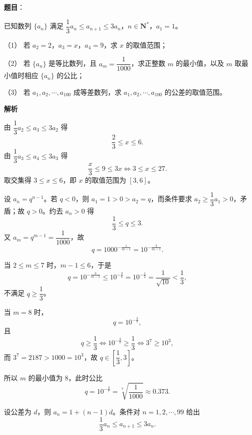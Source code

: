\begin{answer}

\textbf{题目}：

已知数列 $\{a_n\}$ 满足 $\dfrac13a_n\leqslant a_{n+1}\leqslant3a_n$，$n\in\mathbf N^*$，$a_1=1$。

（1） 若 $a_2=2$，$a_3=x$，$a_4=9$，求 $x$ 的取值范围；

（2） 若 $\{a_n\}$ 是等比数列，且 $a_m=\dfrac1{1000}$，求正整数 $m$ 的最小值，以及 $m$ 取最小值时相应 $\{a_n\}$ 的公比；

（3） 若 $a_1,a_2,\cdots,a_{100}$ 成等差数列，求 $a_1,a_2,\cdots,a_{100}$ 的公差的取值范围。

\textbf{解析}


由 $\dfrac13a_2\leqslant a_3\leqslant3a_2$ 得
\nopagebreak[4]
\[\frac23\leqslant x\leqslant6 .\]
由 $\dfrac13a_3\leqslant a_4\leqslant3a_3$ 得
\nopagebreak[4]
\[\frac x3\leqslant9\leqslant3x\iff3\leqslant x\leqslant27 .\]
取交集得 $3\leqslant x\leqslant6$，即 $x$ 的取值范围为 $[3,6]$。


设 $a_n=q^{n-1}$。若 $q<0$，则 $a_1=1>0>a_2=q$，而条件要求 $a_2\geqslant\dfrac13a_1>0$，矛盾；故 $q>0$。约去 $a_n>0$ 得
\nopagebreak[4]
\[\frac13\leqslant q\leqslant3 .\]
又 $a_m=q^{m-1}=\dfrac1{1000}$，故
\nopagebreak[4]
\[q=1000^{-\frac1{m-1}}=10^{-\frac3{m-1}} .\]

当 $2\leqslant m\leqslant7$ 时，$m-1\leqslant6$，于是
\nopagebreak[4]
\[q=10^{-\frac3{m-1}}\leqslant10^{-\frac36}=10^{-\frac12}=\frac1{\sqrt{10}}<\frac13,\]
不满足 $q\geqslant\dfrac13$。

当 $m=8$ 时，
\nopagebreak[4]
\[q=10^{-\frac37},\]
且
\nopagebreak[4]
\[q\geqslant\frac13\iff10^{-\frac37}\geqslant\frac13\iff3^7\geqslant10^3,\]
而 $3^7=2187>1000=10^3$，故 $q\in\left[\dfrac13,3\right]$。

所以 $m$ 的最小值为 $8$，此时公比
\nopagebreak[4]
\[q=10^{-\frac37}=\sqrt[7]{\frac1{1000}}\approx0.373 .\]


设公差为 $d$，则 $a_n=1+(n-1)d$。条件对 $n=1,2,\cdots,99$ 给出
\nopagebreak[4]
\[\frac13a_n\leqslant a_{n+1}\leqslant3a_n .\]


\end{answer}
